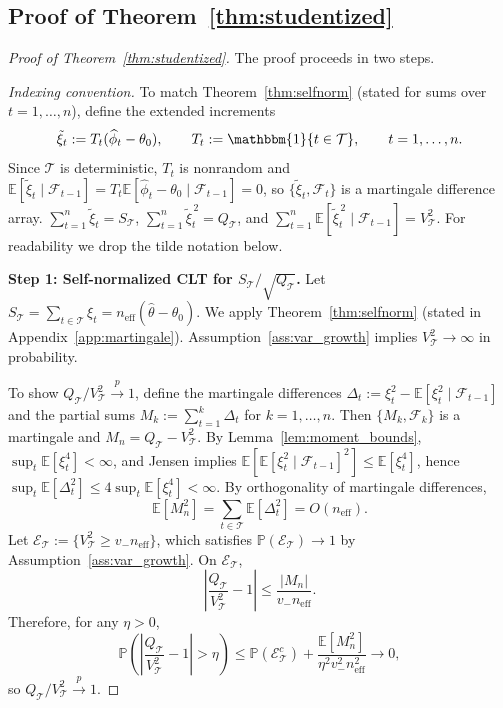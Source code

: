 \documentclass[11pt]{article}
\numberwithin{equation}{section}
\theoremstyle{plain}
\theoremstyle{definition}
\theoremstyle{remark}
\newcommand{\E}{\mathbb{E}}
\newcommand{\Pp}{\mathbb{P}}
\newcommand{\ind}[1]{\mathbbm{1}\{#1\}}
\newcommand{\pto}{\xrightarrow{p}}
\begin{document}
\subsection{Proof of Theorem~\ref{thm:studentized}}\label{app:proof_studentized}
\begin{proof}[Proof of Theorem~\ref{thm:studentized}]
The proof proceeds in two steps.

\medskip\noindent\emph{Indexing convention.}
To match Theorem~\ref{thm:selfnorm} (stated for sums over $t=1,\dots,n$), define the extended increments
\[
\tilde\xi_t := T_t(\widehat\phi_t-\theta_0), \qquad T_t:=\ind{t\in\mathcal{T}},
\qquad t=1,\dots,n.
\]
Since $\mathcal{T}$ is deterministic, $T_t$ is nonrandom and
$\E[\tilde\xi_t\mid\mathcal{F}_{t-1}]=T_t\E[\widehat\phi_t-\theta_0\mid\mathcal{F}_{t-1}]=0$,
so $\{\tilde\xi_t,\mathcal{F}_t\}$ is a martingale difference array.
$\sum_{t=1}^n \tilde\xi_t = S_{\mathcal{T}}$, $\sum_{t=1}^n \tilde\xi_t^{\,2} = Q_{\mathcal{T}}$,
and $\sum_{t=1}^n \E[\tilde\xi_t^{\,2}\mid \mathcal{F}_{t-1}] = V_{\mathcal{T}}^2$.
For readability we drop the tilde notation below.

\medskip\noindent\textbf{Step 1: Self-normalized CLT for $S_{\mathcal{T}}/\sqrt{Q_{\mathcal{T}}}$.}
Let $S_{\mathcal{T}} = \sum_{t\in\mathcal{T}} \xi_t = n_{\mathrm{eff}}(\widehat\theta - \theta_0)$. We apply Theorem~\ref{thm:selfnorm} (stated in Appendix~\ref{app:martingale}). Assumption~\ref{ass:var_growth} implies $V_{\mathcal{T}}^2 \to \infty$ in probability.

To show $Q_{\mathcal{T}}/V_{\mathcal{T}}^2\pto 1$, define the martingale differences
$\Delta_t:=\xi_t^2-\E[\xi_t^2\mid \mathcal{F}_{t-1}]$ and the partial sums
$M_k:=\sum_{t=1}^k\Delta_t$ for $k=1,\dots,n$. Then $\{M_k,\mathcal{F}_k\}$ is a martingale and
$M_n=Q_{\mathcal{T}}-V_{\mathcal{T}}^2$.
By Lemma~\ref{lem:moment_bounds}, $\sup_t\E[\xi_t^4]<\infty$, and Jensen implies
$\E[\E[\xi_t^2\mid\mathcal{F}_{t-1}]^2]\le \E[\xi_t^4]$, hence
$\sup_t\E[\Delta_t^2]\le 4\sup_t\E[\xi_t^4]<\infty$.
By orthogonality of martingale differences,
\[
\E[M_n^2]=\sum_{t\in\mathcal{T}}\E[\Delta_t^2]=O(n_{\mathrm{eff}}).
\]
Let $\mathcal{E}_{\mathcal{T}}:=\{V_{\mathcal{T}}^2\ge v_- n_{\mathrm{eff}}\}$,
which satisfies $\Pp(\mathcal{E}_{\mathcal{T}})\to 1$ by Assumption~\ref{ass:var_growth}.
On $\mathcal{E}_{\mathcal{T}}$,
\[
\left|\frac{Q_{\mathcal{T}}}{V_{\mathcal{T}}^2}-1\right|
\le \frac{|M_n|}{v_- n_{\mathrm{eff}}}.
\]
Therefore, for any $\eta>0$,
\[
\Pp\!\left(\left|\frac{Q_{\mathcal{T}}}{V_{\mathcal{T}}^2}-1\right|>\eta\right)
\le \Pp(\mathcal{E}_{\mathcal{T}}^c)
+\frac{\E[M_n^2]}{\eta^2 v_-^2 n_{\mathrm{eff}}^{2}}
\to 0,
\]
so $Q_{\mathcal{T}}/V_{\mathcal{T}}^2\pto 1$.


\end{proof}
\end{document}

